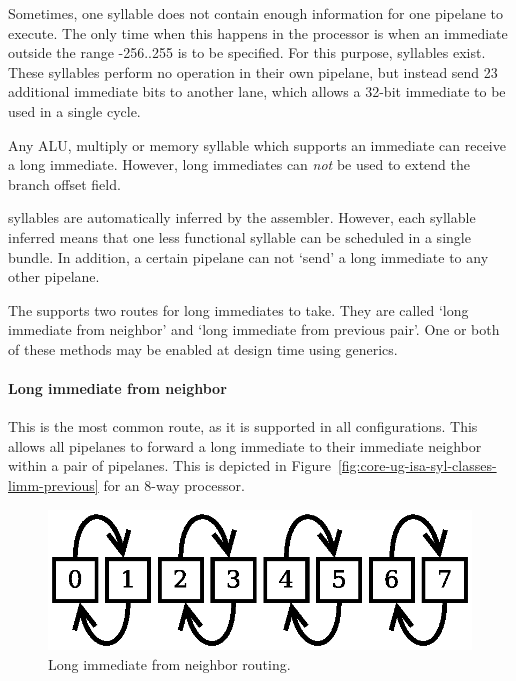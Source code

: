 Sometimes, one syllable does not contain enough information for one pipelane to 
execute. The only time when this happens in the \rvex{} processor is when an 
immediate outside the range -256..255 is to be specified. For this purpose, 
 syllables exist. These syllables perform no operation in their own 
pipelane, but instead send 23 additional immediate bits to another lane, which 
allows a 32-bit immediate to be used in a single cycle.

Any ALU, multiply or memory syllable which supports an immediate can receive a
long immediate. However, long immediates can \textit{not} be used to extend the
branch offset field.

 syllables are automatically inferred by the assembler. However,
each  syllable inferred means that one less functional syllable can
be scheduled in a single bundle. In addition, a certain pipelane can not `send'
a long immediate to any other pipelane.

The \rvex{} supports two routes for long immediates to take. They are called
`long immediate from neighbor' and `long immediate from previous pair'. One or
both of these methods may be enabled at design time using generics.

\paragraph*{Long immediate from neighbor}

This is the most common route, as it is supported in all \rvex{} configurations. 
This allows all pipelanes to forward a long immediate to their immediate 
neighbor within a pair of pipelanes. This is depicted in 
Figure~\ref{fig:core-ug-isa-syl-classes-limm-previous} for an 8-way \rvex{} 
processor.

\begin{figure}[h!]
  \centering
  \includegraphics[scale=0.6]{assets/long-immediate-fwding/neighbor}
  \caption{Long immediate from neighbor routing.}
  \label{fig:core-ug-isa-syl-classes-limm-neighbor}
\end{figure}


